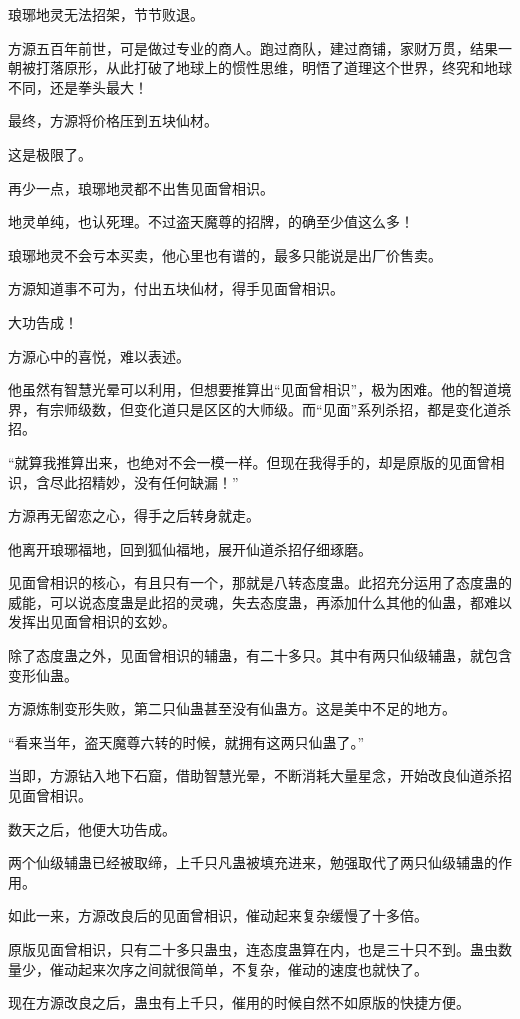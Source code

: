 \begin{this_body}
琅琊地灵无法招架，节节败退。

方源五百年前世，可是做过专业的商人。跑过商队，建过商铺，家财万贯，结果一朝被打落原形，从此打破了地球上的惯性思维，明悟了道理这个世界，终究和地球不同，还是拳头最大！

最终，方源将价格压到五块仙材。

这是极限了。

再少一点，琅琊地灵都不出售见面曾相识。

地灵单纯，也认死理。不过盗天魔尊的招牌，的确至少值这么多！

琅琊地灵不会亏本买卖，他心里也有谱的，最多只能说是出厂价售卖。

方源知道事不可为，付出五块仙材，得手见面曾相识。

大功告成！

方源心中的喜悦，难以表述。

他虽然有智慧光晕可以利用，但想要推算出“见面曾相识”，极为困难。他的智道境界，有宗师级数，但变化道只是区区的大师级。而“见面”系列杀招，都是变化道杀招。

“就算我推算出来，也绝对不会一模一样。但现在我得手的，却是原版的见面曾相识，含尽此招精妙，没有任何缺漏！”

方源再无留恋之心，得手之后转身就走。

他离开琅琊福地，回到狐仙福地，展开仙道杀招仔细琢磨。

见面曾相识的核心，有且只有一个，那就是八转态度蛊。此招充分运用了态度蛊的威能，可以说态度蛊是此招的灵魂，失去态度蛊，再添加什么其他的仙蛊，都难以发挥出见面曾相识的玄妙。

除了态度蛊之外，见面曾相识的辅蛊，有二十多只。其中有两只仙级辅蛊，就包含变形仙蛊。

方源炼制变形失败，第二只仙蛊甚至没有仙蛊方。这是美中不足的地方。

“看来当年，盗天魔尊六转的时候，就拥有这两只仙蛊了。”

当即，方源钻入地下石窟，借助智慧光晕，不断消耗大量星念，开始改良仙道杀招见面曾相识。

数天之后，他便大功告成。

两个仙级辅蛊已经被取缔，上千只凡蛊被填充进来，勉强取代了两只仙级辅蛊的作用。

如此一来，方源改良后的见面曾相识，催动起来复杂缓慢了十多倍。

原版见面曾相识，只有二十多只蛊虫，连态度蛊算在内，也是三十只不到。蛊虫数量少，催动起来次序之间就很简单，不复杂，催动的速度也就快了。

现在方源改良之后，蛊虫有上千只，催用的时候自然不如原版的快捷方便。


\end{this_body}
